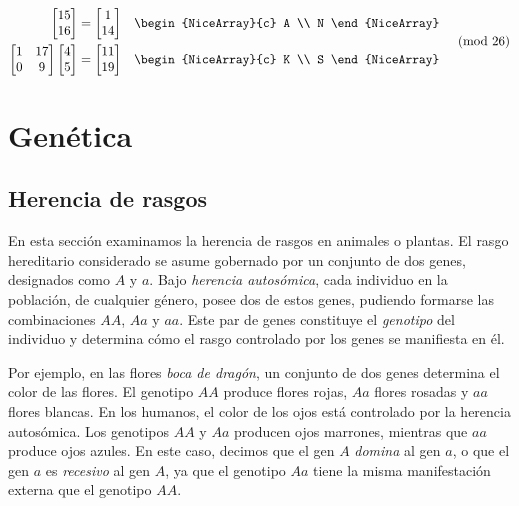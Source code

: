 \begin{examplebox}{}{}
$$\begin{aligned}
\begin{bmatrix}
            15 \\
            16
        \end{bmatrix} & = \begin{bmatrix}
            1 \\
            14
        \end{bmatrix} & & \begin{NiceArray}{c}
            A \\
            N
        \end{NiceArray} \\
        \begin{bmatrix}
            1 & 17 \\
            0 & 9
        \end{bmatrix} \begin{bmatrix}
            4 \\
            5
        \end{bmatrix} & = \begin{bmatrix}
            11 \\
            19
        \end{bmatrix} & & \begin{NiceArray}{c}
            K \\
            S
        \end{NiceArray}
    \end{aligned} \quad \pmod{26}$$
\end{examplebox}

\newpage

\section{Genética}

\subsection*{Herencia de rasgos}

En esta sección examinamos la herencia de rasgos en animales o plantas. El rasgo hereditario considerado se asume gobernado por un conjunto de dos genes, designados como $A$ y $a$. Bajo \emph{herencia autosómica}, cada individuo en la población, de cualquier género, posee dos de estos genes, pudiendo formarse las combinaciones $AA$, $Aa$ y $aa$. Este par de genes constituye el \emph{genotipo} del individuo y determina cómo el rasgo controlado por los genes se manifiesta en él.

Por ejemplo, en las flores \emph{boca de dragón}, un conjunto de dos genes determina el color de las flores. El genotipo $AA$ produce flores rojas, $Aa$ flores rosadas y $aa$ flores blancas. En los humanos, el color de los ojos está controlado por la herencia autosómica. Los genotipos $AA$ y $Aa$ producen ojos marrones, mientras que $aa$ produce ojos azules. En este caso, decimos que el gen $A$ \emph{domina} al gen $a$, o que el gen $a$ es \emph{recesivo} al gen $A$, ya que el genotipo $Aa$ tiene la misma manifestación externa que el genotipo $AA$.

